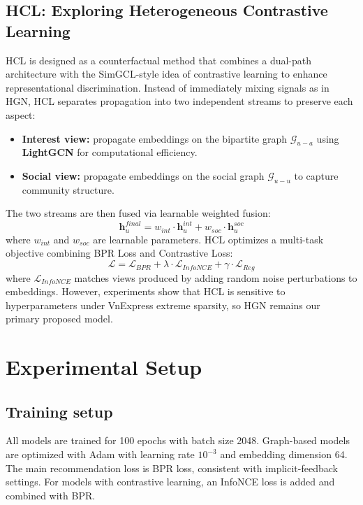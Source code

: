 \documentclass[11pt]{article}
\begin{document}
\subsection{HCL: Exploring Heterogeneous Contrastive Learning}
HCL is designed as a counterfactual method that combines a dual-path architecture with the SimGCL-style idea of contrastive learning to enhance representational discrimination. Instead of immediately mixing signals as in HGN, HCL separates propagation into two independent streams to preserve each aspect:
\begin{itemize}
    \item \textbf{Interest view:} propagate embeddings on the bipartite graph $\mathcal{G}_{u-a}$ using \textbf{LightGCN} for computational efficiency.
    \item \textbf{Social view:} propagate embeddings on the social graph $\mathcal{G}_{u-u}$ to capture community structure.
\end{itemize}

The two streams are then fused via learnable weighted fusion:
\begin{equation}
    \mathbf{h}_u^{final} = w_{int} \cdot \mathbf{h}_u^{int} + w_{soc} \cdot \mathbf{h}_u^{soc}
\end{equation}
where $w_{int}$ and $w_{soc}$ are learnable parameters. HCL optimizes a multi-task objective combining BPR Loss and Contrastive Loss:
\begin{equation}
    \mathcal{L} = \mathcal{L}_{BPR} + \lambda \cdot \mathcal{L}_{InfoNCE} + \gamma \cdot \mathcal{L}_{Reg}
\end{equation}
where $\mathcal{L}_{InfoNCE}$ matches views produced by adding random noise perturbations to embeddings. However, experiments show that HCL is sensitive to hyperparameters under VnExpress extreme sparsity, so HGN remains our primary proposed model.

\section{Experimental Setup}
\label{sec:exp}

\subsection{Training setup}
All models are trained for 100 epochs
with batch size 2048.
Graph-based models are optimized with Adam
with learning rate $10^{-3}$ and embedding dimension 64.
The main recommendation loss is BPR loss,
consistent with implicit-feedback settings.
For models with contrastive learning,
an InfoNCE loss is added and combined with BPR.
\end{document}

